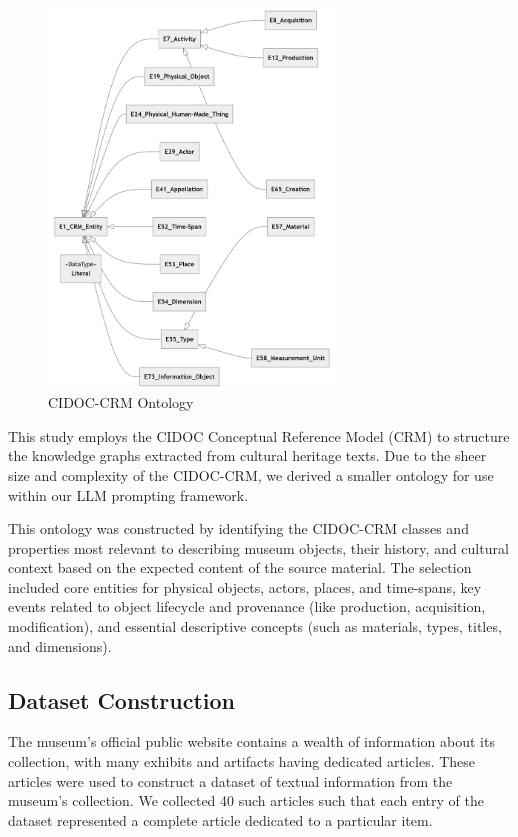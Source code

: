 \documentclass[a4, conference]{IEEEtran}
\begin{document}
\begin{figure}[!t]
    \centering
    \includegraphics[width=3in]{assets/ontology}
    \caption{CIDOC-CRM Ontology}
    \label{fig_ontology}
\end{figure}

This study employs the CIDOC Conceptual Reference Model (CRM) to structure the knowledge graphs extracted from cultural heritage texts. Due to the sheer size and complexity of the CIDOC-CRM, we derived a smaller ontology for use within our LLM prompting framework.

This ontology was constructed by identifying the CIDOC-CRM classes and properties most relevant to describing museum objects, their history, and cultural context based on the expected content of the source material. The selection included core entities for physical objects, actors, places, and time-spans, key events related to object lifecycle and provenance (like production, acquisition, modification), and essential descriptive concepts (such as materials, types, titles, and dimensions).

\subsection{Dataset Construction}

The museum's official public website contains a wealth of information about its collection, with many exhibits and artifacts having dedicated articles. These articles were used to construct a dataset of textual information from the museum's collection. We collected 40 such articles such that each entry of the dataset represented a complete article dedicated to a particular item.
\end{document}
